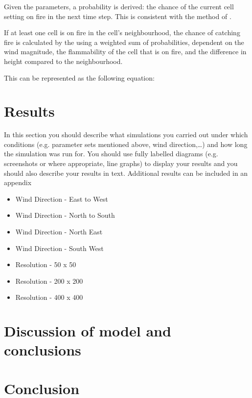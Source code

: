 \documentclass[11pt, a4paper, titlepage]{article}
\begin{document}
Given the parameters, a probability is derived: the chance of the current cell setting on fire in the next time step. This is consistent with the method of \cite{ALEXANDRIDIS2008191}.


If at least one cell is on fire in the cell's neighbourhood, the chance of catching fire is calculated by the using a weighted sum of probabilities, dependent on the wind magnitude, the flammability of the cell that is on fire, and the difference in height compared to the neighbourhood.

This can be represented as the following equation:

\section{Results}
\begin{displayquote}
  In this section you should describe what simulations you
carried out under which conditions (e.g. parameter sets mentioned above, wind direction,…) and
how long the simulation was run for. You should use fully labelled diagrams (e.g. screenshots or
where appropriate, line graphs) to display your results and you should also describe your results in
text. Additional results can be included in an appendix
\end{displayquote}

\begin{itemize}
  \item Wind Direction - East to West
  \item Wind Direction - North to South
  \item Wind Direction - North East
  \item Wind Direction - South West
  \item Resolution     -  50 x  50
  \item Resolution     - 200 x 200
  \item Resolution     - 400 x 400
\end{itemize}
\newpage
\section{Discussion of model and conclusions} 
\section{Conclusion}

\newpage
\renewcommand{\bibname}{Bibliography}


\end{document}
